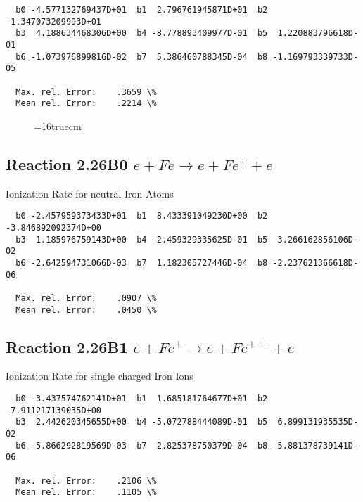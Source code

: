 \documentclass[12pt,dvipdfmx]{article}
\begin{document}
\begin{small}\begin{verbatim}
  b0 -4.577132769437D+01  b1  2.796761945871D+01  b2 -1.347073209993D+01
  b3  4.188634468306D+00  b4 -8.778893409977D-01  b5  1.220883796618D-01
  b6 -1.073976899816D-02  b7  5.386460788345D-04  b8 -1.169793339733D-05

  Max. rel. Error:    .3659 \%
  Mean rel. Error:    .2214 \%

\end{verbatim}\end{small}


\begin{figure} \label{2.18B}
\epsfxsize=16truecm
\end{figure}
\newpage



\subsection{
Reaction 2.26B0   $e + Fe  \rightarrow e + Fe^+  + e$
}

  Ionization Rate for neutral Iron Atoms

\begin{small}\begin{verbatim}
  b0 -2.457959373433D+01  b1  8.433391049230D+00  b2 -3.846892092374D+00
  b3  1.185976759143D+00  b4 -2.459329335625D-01  b5  3.266162856106D-02
  b6 -2.642594731066D-03  b7  1.182305727446D-04  b8 -2.237621366618D-06

  Max. rel. Error:    .0907 \%
  Mean rel. Error:    .0450 \%

\end{verbatim}\end{small}



\subsection{
Reaction 2.26B1   $e + Fe^+ \rightarrow e + Fe^{++} + e$
}

  Ionization Rate for single charged Iron Ions

\begin{small}\begin{verbatim}
  b0 -3.437574762141D+01  b1  1.685181764677D+01  b2 -7.911217139035D+00
  b3  2.442620345655D+00  b4 -5.072788444089D-01  b5  6.899131935535D-02
  b6 -5.866292819569D-03  b7  2.825378750379D-04  b8 -5.881378739141D-06

  Max. rel. Error:    .2106 \%
  Mean rel. Error:    .1105 \%


\end{verbatim}\end{small}
\end{document}
